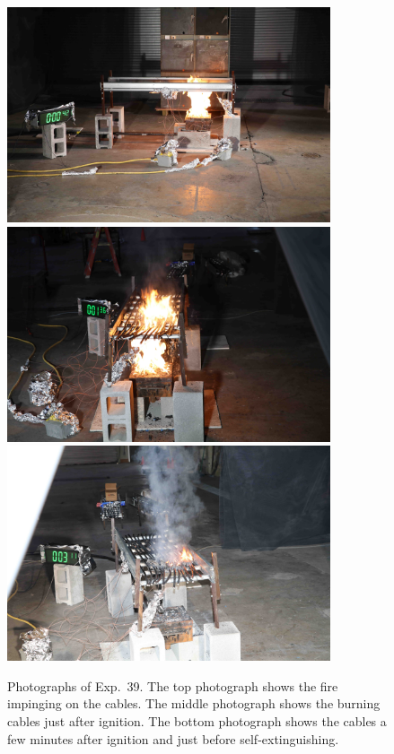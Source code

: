 \begin{figure}[p]
\centering
\includegraphics[height=2.50in]{../FIGURES/Test_39_side} \\ \vspace{0.1in}
\includegraphics[height=2.50in]{../FIGURES/Test_39_1_min_36_s} \\ \vspace{0.1in}
\includegraphics[height=2.50in]{../FIGURES/Test_39_3_min_11_s}
\caption[Photographs of Exp.~39]{Photographs of Exp.~39. The top photograph shows the fire impinging on the cables. The middle photograph shows the burning cables just after ignition. The bottom photograph shows the cables a few minutes after ignition and just before self-extinguishing.}
\label{fig:Test_39_photos}
\end{figure}


